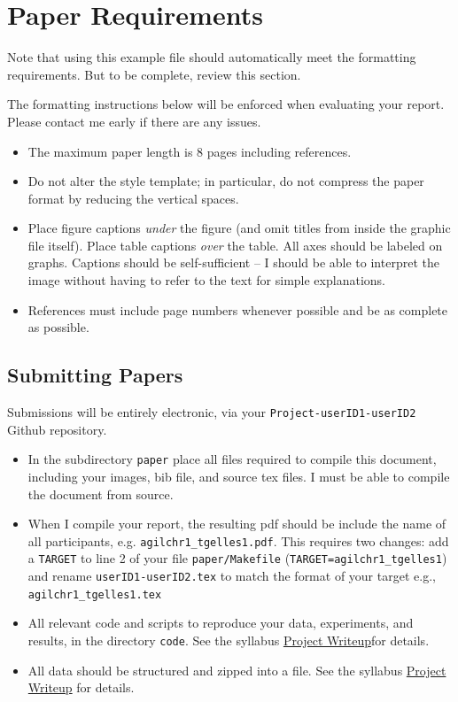\documentclass{article}
\begin{document}
\section{Paper Requirements}
\label{requirements}
Note that using this example file should automatically meet the formatting
requirements.  But to be complete, review this section.

The formatting instructions below will be enforced when evaluating your
report.  Please contact me early if there are any issues.
\begin{itemize}
\item The maximum paper length is 8 pages including references.
\item Do not alter the style template; in particular, do not compress the paper format
by reducing the vertical spaces.
\item Place figure captions {\em under} the figure (and omit titles from
  inside the graphic file itself).  Place table captions {\em over}
  the table. All axes should be labeled on graphs.  Captions
  should be self-sufficient -- I should be able to interpret the image without
  having to refer to the text for simple explanations.
\item References must include page numbers whenever possible and be as
  complete as possible.
\end{itemize}

\subsection{Submitting Papers}
\label{submit}

Submissions will be entirely electronic, via your {\tt Project-userID1-userID2}
Github repository.
\begin{itemize}
  \item In the subdirectory {\tt paper} place all files required to compile this document, including your
    images, bib file, and source tex files.  I
    must be able to compile the document from source.
   \item When I compile your report, the resulting pdf should be include the
   name of all participants, e.g.  {\tt agilchr1\_tgelles1.pdf}.  This
   requires two changes: add a {\tt TARGET} to line 2 of your
   file {\tt paper/Makefile} ({\tt TARGET=agilchr1\_tgelles1}) and rename {\tt userID1-userID2.tex} to
   match the format of your target e.g., {\tt agilchr1\_tgelles1.tex}
   \item All relevant code and scripts to reproduce your data, experiments,
     and results, in the directory {\tt code}.  See the syllabus \href{https://www.cs.swarthmore.edu/\~{}soni/cs68/s17/Labs/project.html}{Project Writeup}for details.
   \item All data should be structured and zipped into a file.  See the syllabus  \href{https://www.cs.swarthmore.edu/\~{}soni/cs68/s17/Labs/project.html}{Project Writeup}
   for details.
\end{itemize}
\end{document}

